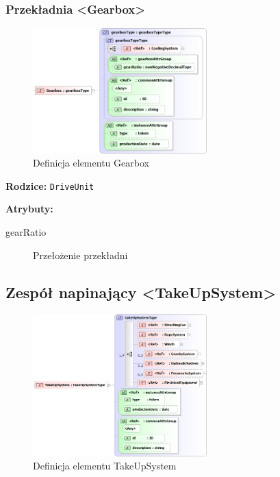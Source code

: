 \documentclass[12pt,a4paper]{article}
\begin{document}
\subsubsection{Przekładnia <Gearbox>}

\begin{figure}[H]
  \centering
  \includegraphics[width=0.6\textwidth]{png/liquid/Gearbox}
  \caption{Definicja elementu Gearbox}
  \label{fig:gearbox-xsd}
\end{figure}

\noindent\textbf{Rodzice:} \texttt{DriveUnit}

\noindent\textbf{Atrybuty:}
\begin{description}
\item[gearRatio] Przełożenie przekładni
\end{description}


\subsection{Zespół napinający <TakeUpSystem>}

\begin{figure}[H]
  \centering
  \includegraphics[width=0.6\textwidth]{png/liquid/TakeUpSystem}
  \caption{Definicja elementu TakeUpSystem}
  \label{fig:takeUpSystem-xsd}
\end{figure}
\end{document}
